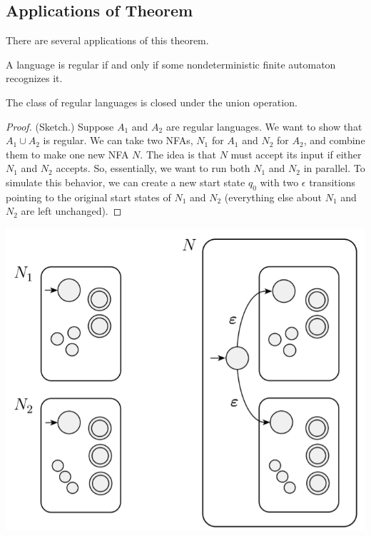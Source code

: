 \documentclass[letterpaper]{article}
\begin{document}
\subsection{Applications of Theorem}
There are several applications of this theorem. 

\begin{corollary}{}{}
    A language is regular if and only if some nondeterministic finite automaton recognizes it.
\end{corollary}


\begin{theorem}{}{}
    The class of regular languages is closed under the union operation.
\end{theorem}

\begin{mdframed}[]
    \begin{proof}
        (Sketch.) Suppose $A_1$ and $A_2$ are regular languages. We want to show that $A_1 \cup A_2$ is regular. We can take two NFAs, $N_1$ for $A_1$ and $N_2$ for $A_2$, and combine them to make one new NFA $N$. The idea is that $N$ must accept its input if either $N_1$ and $N_2$ accepts. So, essentially, we want to run both $N_1$ and $N_2$ in parallel. To simulate this behavior, we can create a new start state $q_0$ with two $\epsilon$ transitions pointing to the original start states of $N_1$ and $N_2$ (everything else about $N_1$ and $N_2$ are left unchanged).    
    \end{proof}
\end{mdframed}

\begin{center}
    \includegraphics[scale=0.5]{assets/union_nfa.png}
\end{center}
\end{document}

